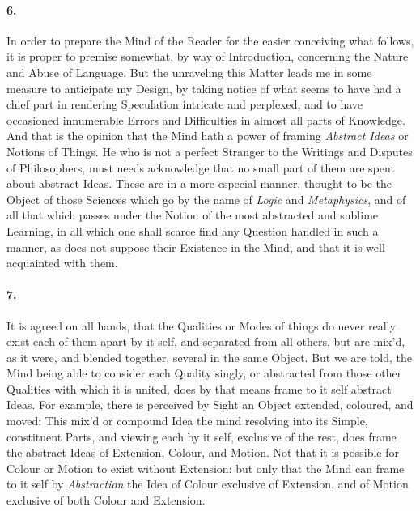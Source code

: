 \documentclass[]{article}
\newenvironment{sectionbody}{}{}
\begin{document}
\begin{sectionbody}
\paragraph{6.} In order to prepare the Mind of the Reader for the easier
conceiving what follows, it is proper to premise somewhat, by way
of Introduction, concerning the Nature and Abuse of Language.
But the unraveling this Matter leads me in some measure to
anticipate my Design, by taking notice of what seems to have had
a chief part in rendering Speculation intricate and perplexed,
and to have occasioned innumerable Errors and Difficulties in
almost all parts of Knowledge.  And that is the opinion that the
Mind hath a power of framing \emph{Abstract Ideas} or Notions
of Things.  He who is not a perfect Stranger to the Writings and
Disputes of Philosophers, must needs acknowledge that no small
part of them are spent about abstract Ideas.  These are in a more
especial manner, thought to be the Object of those Sciences which
go by the name of \emph{Logic} and \emph{Metaphysics}, and of
all that which passes under the Notion of the most abstracted and
sublime Learning, in all which one shall scarce find any Question
handled in such a manner, as does not suppose their Existence in
the Mind, and that it is well acquainted with them.



\paragraph{7.} It is agreed on all hands, that the Qualities or Modes of things
do never really exist each of them apart by it self, and
separated from all others, but are mix'd, as it were, and blended
together, several in the same Object.  But we are told, the Mind
being able to consider each Quality singly, or abstracted from
those other Qualities with which it is united, does by that means
frame to it self abstract Ideas.  For example, there is perceived
by Sight an Object extended, coloured, and moved: This mix'd or
compound Idea the mind resolving into its Simple, constituent
Parts, and viewing each by it self, exclusive of the rest, does
frame the abstract Ideas of Extension, Colour, and Motion.  Not
that it is possible for Colour or Motion to exist without
Extension: but only that the Mind can frame to it self by
\emph{Abstraction} the Idea of Colour exclusive of Extension,
and of Motion exclusive of both Colour and Extension.




\end{sectionbody}
\end{document}
